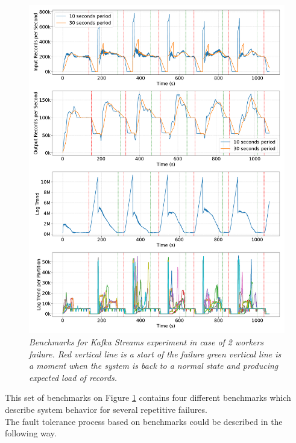 \begin{figure}[H]
    \centering
    \includegraphics[width=1\textwidth]{figures/kstreams-2pods/kafka_2_pods_plot_impact}
    \caption{\textit{Benchmarks for Kafka Streams experiment in case of 2 workers failure.
    Red vertical line is a start of the failure green vertical line is a moment when the system is back to a normal state and
    producing expected load of records.}}
    \label{fig:kafka-2pods-impact}
\end{figure}

This set of benchmarks on Figure \ref{fig:kafka-2pods-impact} contains four different
benchmarks which describe system behavior for several repetitive failures.\\
The fault tolerance process based on benchmarks could be described in the following way.

